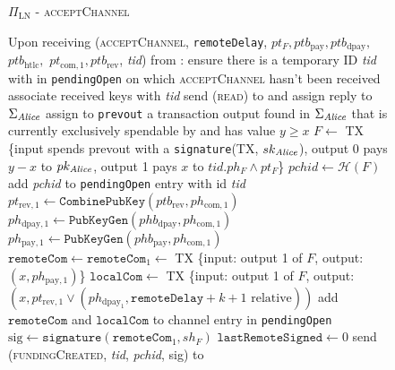   \begin{figure}[H]
    \begin{protocolbox}{$\Pi_{\mathrm{LN}}$ - \textsc{acceptChannel}}
      \begin{algorithmic}[1]
        \State Upon receiving (\textsc{acceptChannel}, \texttt{remoteDelay},
        $pt_F, ptb_{\mathrm{pay}}, ptb_{\mathrm{dpay}},$ $ptb_{\mathrm{htlc}},$
        $pt_{\mathrm{com}, 1}, ptb_{\mathrm{rev}}$, \textit{tid}) from \bob:
        \Indent
          \State ensure there is a temporary ID \textit{tid} with \bob{} in
          \texttt{pendingOpen} on which \textsc{acceptChannel} hasn't been
          received
          \State associate received keys with \textit{tid}
          \State send (\textsc{read}) to \ledger{} and assign reply to
          $\Sigma_{\mathit{Alice}}$
          \State assign to \texttt{prevout} a transaction output found in
          $\Sigma_{\mathit{Alice}}$ that is currently exclusively spendable by \alice{}
          and has value $y \geq x$
          \State $F \gets$ TX \{input spends prevout with a
          \texttt{signature}(TX, $sk_{\mathit{Alice}}$), output 0 pays $y - x$ to
          $pk_{\mathit{Alice}}$, output 1 pays $x$ to $\mathit{tid}.ph_F \wedge pt_F$\}
          \State $\mathit{pchid} \gets \mathcal{H}\left(F\right)$
          \State add \textit{pchid} to \texttt{pendingOpen} entry with id
          \textit{tid}
          \State $pt_{\mathrm{rev}, 1} \gets
          \mathtt{CombinePubKey}\left(ptb_{\mathrm{rev}}, ph_{\mathrm{com},
          1}\right)$
          \State $ph_{\mathrm{dpay}, 1} \gets
          \texttt{PubKeyGen}\left(phb_{\mathrm{dpay}}, ph_{\mathrm{com},
          1}\right)$
          \State $ph_{\mathrm{pay}, 1} \gets
          \texttt{PubKeyGen}\left(phb_{\mathrm{pay}}, ph_{\mathrm{com},
          1}\right)$
          \State $\mathtt{remoteCom} \gets \mathtt{remoteCom}_1 \gets$ TX
          \{input: output 1 of $F$, output: $\left(x, ph_{\mathrm{pay},
          1}\right)$\}
          \State $\mathtt{localCom} \gets$ TX \{input: output 1 of $F$, output:
          $\left(x, pt_{\mathrm{rev}, 1} \vee \left(ph_{\mathrm{dpay}_1},
          \mathtt{remoteDelay} + k + 1 \text{ relative}\right)\right)$
          \State add $\mathtt{remoteCom}$ and $\mathtt{localCom}$ to channel
          entry in \texttt{pendingOpen}
          \State $\mathrm{sig} \gets
          \mathtt{signature}\left(\mathtt{remoteCom}_1, sh_F\right)$
          \State $\mathtt{lastRemoteSigned} \gets 0$
          \State send (\textsc{fundingCreated}, \textit{tid},
          \textit{pchid}, sig) to \bob{}
        \EndIndent
      \end{algorithmic}
    \end{protocolbox}
    \caption{}
    \label{alg:protocol:open:acceptChannel}
  \end{figure}

